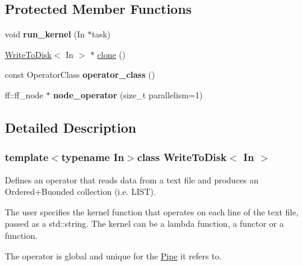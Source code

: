\subsection*{\-Protected \-Member \-Functions}
\begin{DoxyCompactItemize}
\item 
\hypertarget{class_write_to_disk_a9b5fc69a20e3a5d95d8522711f263104}{void {\bfseries run\-\_\-kernel} (\-In $\ast$task)}\label{class_write_to_disk_a9b5fc69a20e3a5d95d8522711f263104}

\item 
\hyperlink{class_write_to_disk}{\-Write\-To\-Disk}$<$ \-In $>$ $\ast$ \hyperlink{class_write_to_disk_a0f070d389c1624810e727f648e0fc8fd}{clone} ()
\item 
\hypertarget{class_write_to_disk_a5a4d3a2a0018e52510389b7d630ed794}{const \-Operator\-Class {\bfseries operator\-\_\-class} ()}\label{class_write_to_disk_a5a4d3a2a0018e52510389b7d630ed794}

\item 
\hypertarget{class_write_to_disk_a3e11c7f32347dd1ec43ed11103d656b7}{ff\-::ff\-\_\-node $\ast$ {\bfseries node\-\_\-operator} (size\-\_\-t parallelism=1)}\label{class_write_to_disk_a3e11c7f32347dd1ec43ed11103d656b7}

\end{DoxyCompactItemize}


\subsection{\-Detailed \-Description}
\subsubsection*{template$<$typename \-In$>$class Write\-To\-Disk$<$ In $>$}

\-Defines an operator that reads data from a text file and produces an \-Ordered+\-Buonded collection (i.\-e. \-L\-I\-S\-T).

\-The user specifies the kernel function that operates on each line of the text file, passed as a std\-::string. \-The kernel can be a lambda function, a functor or a function.

\-The operator is global and unique for the \hyperlink{class_pipe}{\-Pipe} it refers to. 

